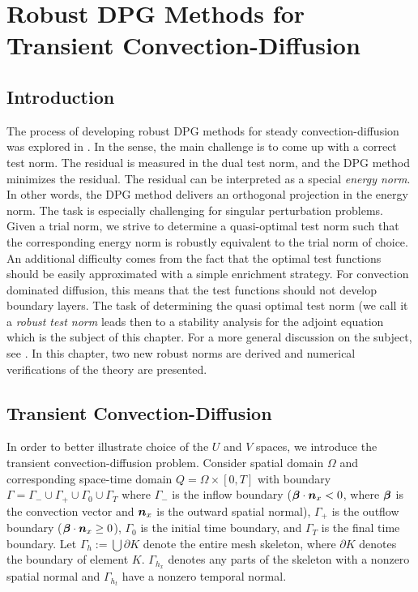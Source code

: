 \documentclass[Dissertation.tex]{subfiles}
\begin{document}
\chapter[Robust DPG Methods for Transient Convection-Diffusion]{Robust DPG Methods for Transient Convection-Diffusion
}
\label{sec:robust}
\section{Introduction}
The process of developing robust DPG methods for steady convection-diffusion was explored in \cite{DemkowiczHeuer,ChanHeuerThanhDemkowicz2012}.
In the sense, the main challenge is to come up with a correct test norm. The residual is measured
in the dual test norm, and the DPG method minimizes the residual. The residual can be interpreted
as a special {\em energy norm}. In other words, the DPG method delivers an orthogonal
projection in the energy norm. The task is especially challenging for singular perturbation
problems. Given a trial norm, we strive to determine a quasi-optimal test norm such that
the corresponding energy norm is robustly equivalent to the trial  norm of choice. An additional
difficulty comes from the fact that the optimal test functions should be easily approximated
with a simple enrichment strategy. For convection dominated diffusion, this means that
the test functions should not develop boundary layers. The task of determining the
quasi optimal test norm (we call it a {\em robust test norm} leads then to a stability analysis
for the adjoint equation which is the subject of this chapter. For a more general discussion
on the subject, see \cite{DPGEncyclopedia}.
In this chapter, two new robust norms are derived and numerical verifications of the theory are presented.

\section{Transient Convection-Diffusion}
In order to better illustrate choice of the $U$ and $V$ spaces, we introduce the transient convection-diffusion problem.
Consider spatial domain $\Omega$ and corresponding space-time domain $Q=\Omega\times[0,T]$ 
with boundary $\Gamma=\Gamma_-\cup\Gamma_+\cup\Gamma_0\cup\Gamma_T$ 
where $\Gamma_-$ is the inflow boundary ($\boldsymbol\beta\cdot\boldsymbol n_x<0$, where $\boldsymbol\beta$ is the convection vector and $\boldsymbol n_x$ is the outward spatial normal),
$\Gamma_+$ is the outflow boundary ($\boldsymbol\beta\cdot\boldsymbol n_x\geq0$), $\Gamma_0$ is the initial time boundary, 
and $\Gamma_T$ is the final time boundary. Let $\Gamma_h:=\bigcup\partial K$ denote the entire mesh skeleton, 
where $\partial K$ denotes the boundary of element $K$.
$\Gamma_{h_x}$ denotes any parts of the skeleton with a nonzero spatial normal and $\Gamma_{h_t}$ have a nonzero temporal normal.
\end{document}
